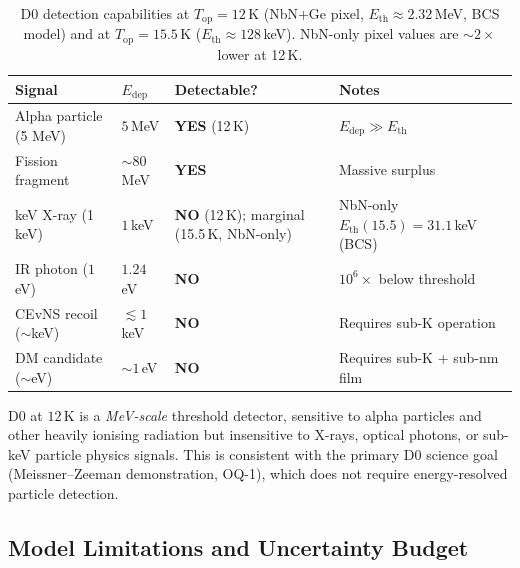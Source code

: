 \begin{table}[ht]
\centering
\caption{D0 detection capabilities at $T_\mathrm{op} = 12$\,K
(NbN+Ge pixel, $E_\mathrm{th} \approx 2.32$\,MeV, BCS model) and at
$T_\mathrm{op} = 15.5$\,K ($E_\mathrm{th} \approx 128$\,keV).
NbN-only pixel values are $\sim 2\times$ lower at 12\,K.}
\label{tab:oq5_comparison}
\small
\begin{tabular}{@{}lllp{5cm}@{}}
\toprule
Signal & $E_\mathrm{dep}$ & Detectable? & Notes \\
\midrule
Alpha particle (5 MeV) & $5$\,MeV & \textbf{YES} (12\,K) &
  $E_\mathrm{dep} \gg E_\mathrm{th}$ \\
Fission fragment & $\sim 80$\,MeV & \textbf{YES} &
  Massive surplus \\
keV X-ray (1\,keV) & $1$\,keV & \textbf{NO} (12\,K); marginal (15.5\,K, NbN-only) &
  NbN-only $E_\mathrm{th}(15.5) = 31.1$\,keV (BCS) \\
IR photon ($1$\,eV) & $1.24$\,eV & \textbf{NO} &
  $10^6\times$ below threshold \\
CEvNS recoil ($\sim$keV) & $\lesssim 1$\,keV & \textbf{NO} &
  Requires sub-K
  operation~\cite{Akimov2017COHERENT} \\
DM candidate ($\sim$eV) & $\sim 1$\,eV & \textbf{NO} &
  Requires sub-K + sub-nm film~\cite{APPEC2021DirectDetection} \\
\bottomrule
\end{tabular}
\end{table}

\noindent D0 at $12$\,K is a \emph{MeV-scale} threshold detector,
sensitive to alpha particles and other heavily ionising radiation but
insensitive to X-rays, optical photons, or sub-keV particle physics signals.
This is consistent with the primary D0 science goal (Meissner--Zeeman
demonstration, OQ-1), which does not require energy-resolved particle
detection.

\subsection{Model Limitations and Uncertainty Budget}
\label{sec:oq5_limitations}

